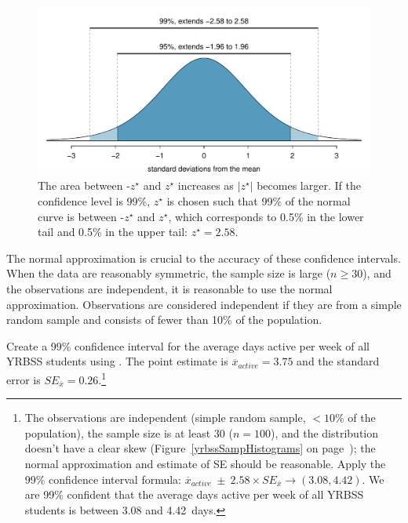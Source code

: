 \begin{spacing}{1.5}
\begin{figure}[h]
	\centering
	\includegraphics[width=\textwidth]
	{ch_inference_foundations_oi_biostat/figures/choosingZForCI/choosingZForCI}
	\caption{The area between -$z^{\star}$ and $z^{\star}$ increases as $|z^{\star}|$ becomes larger. If the confidence level is 99\%, $z^{\star}$ is chosen such that 99\% of the normal curve is between -$z^{\star}$ and $z^{\star}$, which corresponds to 0.5\% in the lower tail and 0.5\% in the upper tail: $z^{\star}=2.58$.}
	\label{choosingZForCI}
\end{figure}
 
The normal approximation is crucial to the accuracy of these confidence intervals. When the data are reasonably symmetric, the sample size is large ($n \geq 30$), and the observations are independent, it is reasonable to use the normal approximation. Observations are considered independent if they are from a simple random sample and consists of fewer than 10\% of the population. 


\begin{exercise} \label{find99CIForYrbssAgeExercise}
	Create a 99\% confidence interval for the average days active per week of all YRBSS students using . The point estimate is $\overline{x}_{active} = 3.75$ and the standard error is $SE_{\overline{x}} = 0.26$.\footnote{The observations are independent (simple random sample, $<10\%$ of the population), the sample size is at least 30 ($n = 100$), and the distribution doesn't have a clear skew (Figure~\ref{yrbssSampHistograms} on page~\pageref{yrbssSampHistograms}); the normal approximation and estimate of SE should be reasonable. Apply the 99\% confidence interval formula: $\overline{x}_{active}\ \pm\ 2.58 \times  SE_{\overline{x}} \rightarrow (3.08, 4.42)$. We are 99\% confident that the average days active per week of all YRBSS students is between 3.08 and 4.42~days.}
\end{exercise}


\end{spacing}
